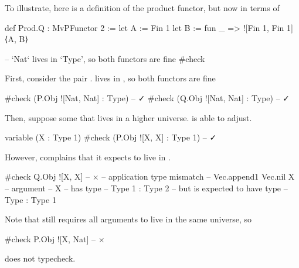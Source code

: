 \documentclass[titlepage]{report}
\begin{document}
To illustrate, here is a definition of the product functor, but now in terms of 
\begin{leancode}
    def Prod.Q : MvPFunctor 2 
      :=  let A := Fin 1
          let B := fun _ => ![Fin 1, Fin 1]
          ⟨A, B⟩

    -- `Nat` lives in `Type', so both functors are fine
    #check  
\end{leancode}
First, consider the pair .  lives in , so both functors are 
fine
\begin{leancode}
    #check (P.Obj ![Nat, Nat] : Type)       -- ✓
    #check (Q.Obj ![Nat, Nat] : Type)       -- ✓
\end{leancode}
Then, suppose some  that lives in a higher universe.
 is able to adjust. 
\begin{leancode}
    variable (X : Type 1)
    #check (P.Obj ![X, X] : Type 1)         -- ✓
\end{leancode}
However,  complains that it expects  to live in .
\begin{leancode}    
    #check Q.Obj ![X, X]                    -- ×            
    -- application type mismatch
    --   Vec.append1 Vec.nil X
    -- argument
    --   X
    -- has type
    --   Type 1 : Type 2
    -- but is expected to have type
    --   Type : Type 1
\end{leancode}

Note that  still requires all arguments to live in the same universe, so
\begin{leancode}
    #check P.Obj ![X, Nat]                  -- ×
\end{leancode}
does not typecheck.
\end{document}
